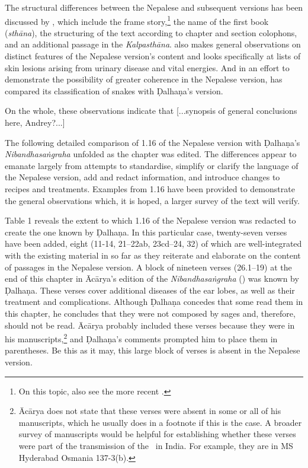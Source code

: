 The structural differences between the Nepalese and subsequent versions has been discussed by \citet[27–44]{kleb-2021b}, which include the frame story,\footnote{On this topic, also see the more recent \citet{birc-2021}.} the name of the first book (\emph{sthāna}), the structuring of the text according to chapter and section colophons, and an additional passage in the \emph{Kalpasthāna}. \citet[44–55]{kleb-2021b} also makes general observations on distinct features of the Nepalese version's content and looks specifically at lists of skin lesions arising from urinary disease and vital energies. And in an effort to demonstrate the possibility of greater coherence in the Nepalese version, \citet[101–104]{hari-2011} has compared its classification of snakes with Ḍalhaṇa's version. 

On the whole, these observations indicate that [...synopsis of general conclusions here, Andrey?...]

The following detailed comparison of 1.16 of the Nepalese version with Ḍalhaṇa's \emph{Nibandhasaṅgraha} unfolded as the chapter was edited. The differences appear to emanate largely from attempts to standardise, simplify or clarify the language of the Nepalese version, add and redact information, and introduce changes to recipes and treatments. Examples from 1.16 have been provided to demonstrate the general observations which, it is hoped, a larger survey of the text will verify.

Table 1 reveals the extent to which 1.16 of the Nepalese version was redacted to create the one known by Ḍalhaṇa. In this particular case, twenty-seven verses have been added, eight (11-14, 21–22ab, 23cd–24, 32) of which are well-integrated with the existing material in so far as they reiterate and elaborate on the content of passages in the Nepalese version. A block of nineteen verses (26.1–19) at the end of this chapter in Ācārya's edition of the \emph{Nibandhasaṅgraha} (\cite[80]{vulgate}) was known by Ḍalhaṇa. These verses cover additional diseases of the ear lobes, as well as their treatment and complications. Although Ḍalhaṇa concedes that some read them in this chapter, he concludes that they were not composed by sages and, therefore, should not be read. Ācārya probably included these verses because they were in his manuscripts,\footnote{Ācārya does not state that these verses were absent in some or all of his manuscripts, which he usually does in a footnote if this is the case. A broader survey of manuscripts would be helpful for establishing whether these verses were part of the transmission of the \SS\ in India. For example, they are in MS Hyderabad Osmania 137-3(b).} and Ḍalhaṇa's comments prompted him to place them in parentheses. Be this as it may, this large block of verses is absent in the Nepalese version. 


